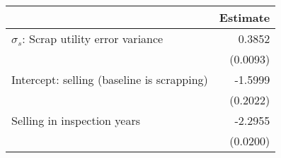 \begin{tabular}{lr} 
\toprule 
                                &     Estimate  \\ 
\midrule 
$\sigma_s$: Scrap utility error variance  &       0.3852  \\ 
                                & (0.0093)  \\ 
Intercept: selling (baseline is scrapping)  &      -1.5999  \\ 
                                & (0.2022)  \\ 
   Selling in inspection years  &      -2.2955  \\ 
                                & (0.0200)  \\ 
\bottomrule \end{tabular} 
